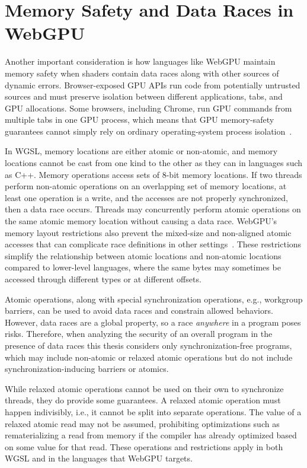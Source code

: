 \section{Memory Safety and Data Races in WebGPU}
\label{sec:bg-mem}

Another important consideration is how languages like WebGPU maintain memory safety when shaders contain data races along with other sources of dynamic errors. Browser-exposed GPU APIs run code from potentially untrusted sources and must preserve isolation between different applications, tabs, and GPU allocations. Some browsers, including Chrome, run GPU commands from multiple tabs in one GPU process, which means that GPU memory-safety guarantees cannot simply rely on ordinary operating-system process isolation~\cite{chromium_webgpu_technical_report}.

In WGSL, memory locations are either atomic or non-atomic, and memory locations cannot be cast from one kind to the other as they can in languages such as C++. Memory operations access sets of 8-bit memory locations. If two threads perform non-atomic operations on an overlapping set of memory locations, at least one operation is a write, and the accesses are not properly synchronized, then a data race occurs. Threads may concurrently perform atomic operations on the same atomic memory location without causing a data race. WebGPU's memory layout restrictions also prevent the mixed-size and non-aligned atomic accesses that can complicate race definitions in other settings~\cite{flur2017mixed}. These restrictions simplify the relationship between atomic locations and non-atomic locations compared to lower-level languages, where the same bytes may sometimes be accessed through different types or at different offsets.

Atomic operations, along with special synchronization operations, e.g., workgroup barriers, can be used to avoid data races and constrain allowed behaviors. However, data races are a global property, so a race \textit{anywhere} in a program poses risks. Therefore, when analyzing the security of an overall program in the presence of data races this thesis considers only synchronization-free programs, which may include non-atomic or relaxed atomic operations but do not include synchronization-inducing barriers or atomics.

While relaxed atomic operations cannot be used on their own to synchronize threads, they do provide some guarantees. A relaxed atomic operation must happen indivisibly, i.e., it cannot be split into separate operations. The value of a relaxed atomic read may not be assumed, prohibiting optimizations such as rematerializing a read from memory if the compiler has already optimized based on some value for that read. These operations and restrictions apply in both WGSL and in the languages that WebGPU targets.

